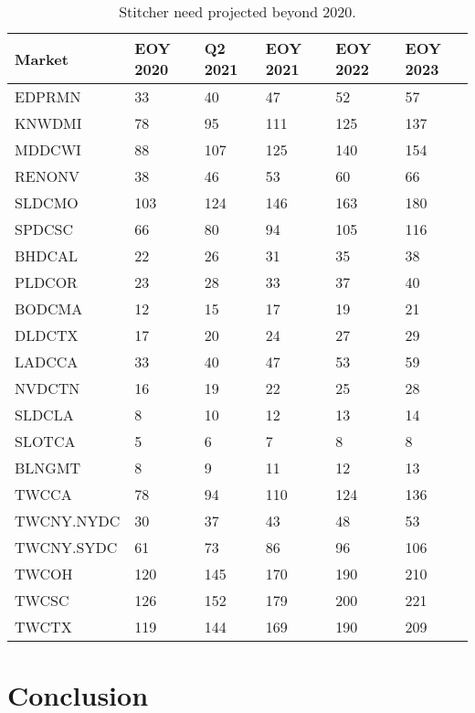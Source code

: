 \documentclass{article}
\begin{document}
\begin{table}
\begin{tabular}{|l|p{16mm}|p{16mm}|p{16mm}|p{16mm}|p{16mm}|} 
\hline Market & EOY 2020 & Q2 2021 & EOY 2021 & EOY 2022 & EOY 2023\\
\hline EDPRMN & 33  &   40 & 	47 & 	52 & 	57 \\
\hline KNWDMI & 78 & 	95 & 	111 & 	125 & 	137 \\
\hline MDDCWI & 88 & 	107 & 	125 & 	140 & 	154 \\
\hline RENONV & 38 & 	46 & 	53 & 	60 & 	66 \\
\hline SLDCMO & 103 & 	124 & 	146 & 	163 & 	180 \\
\hline SPDCSC & 66 & 	80 & 	94 & 	105 & 	116 \\
\hline BHDCAL & 22 & 	26 & 	31 & 	35 & 	38 \\
\hline PLDCOR & 23 & 	28 & 	33 & 	37 & 	40 \\
\hline BODCMA & 12 & 	15 & 	17 & 	19 & 	21 \\
\hline DLDCTX & 17 & 	20 & 	24 & 	27 & 	29 \\
\hline LADCCA & 33 & 	40 & 	47 & 	53 & 	59 \\
\hline NVDCTN & 16 & 	19 & 	22 & 	25 & 	28 \\
\hline SLDCLA & 8 & 	10 & 	12 & 	13 & 	14 \\
\hline SLOTCA & 5 & 	6 & 	7 & 	8 & 	8 \\
\hline BLNGMT & 8 & 	9 & 	11 & 	12 & 	13 \\
\hline TWCCA & 78 & 	94 & 	110 & 	124 & 	136 \\
\hline TWCNY.NYDC & 30 & 	37 & 	43 & 	48 & 	53 \\
\hline TWCNY.SYDC & 61 & 	73 & 	86 & 	96 & 	106 \\
\hline TWCOH & 120 & 	145 & 	170 & 	190 & 	210 \\
\hline TWCSC & 126 & 	152 & 	179 & 	200 & 	221 \\
\hline TWCTX & 119 & 	144 & 	169 & 	190 & 	209 \\
\hline 
\end{tabular}
\caption{\label{TABLE-StitchersNeeded5YR}Stitcher need projected beyond 2020.} 
\end{table}






\section{Conclusion}
\label{SECTION-Conclusion}
\end{document}
